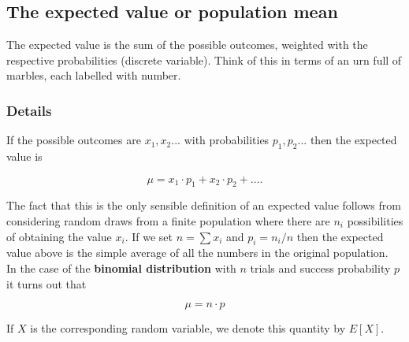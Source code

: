 \documentclass[12pt,a4paper]{article}
\theoremstyle{regla}
\theoremstyle{remark}
\theoremstyle{definition}
\theoremstyle{nonumberbreak}
\begin{document}
\subsection{The expected value or population mean}
\begin{fbox}
\begin{minipage}{0.97\textwidth}
The expected value is the sum of the possible outcomes, weighted with the respective probabilities (discrete variable). Think of this in terms of an urn full of marbles, each labelled with number.
\end{minipage}
\end{fbox}
\subsubsection{Details}
If the possible outcomes are $x_1, x_2...$ with probabilities $p_1, p_2...$ then the expected value is

$$
\mu=x_1 \cdot p_1+x_2 \cdot p_2 + \ldots .
$$

The fact that this is the only sensible definition of an expected value follows from
considering random draws from a finite population where there are $n_i$ possibilities of
obtaining the value $x_i$. If we set $n=\sum x_i$ and $p_i=n_i/n$ then the expected 
value above is the simple average of all the numbers in the original population.\\
In the case of the {\bf binomial distribution} with $n$ trials and success probability $p$ it turns out that 

$$
\mu=n \cdot p
$$

If $X$ is the corresponding random variable, we denote this quantity by $E[X]$.
\end{document}
